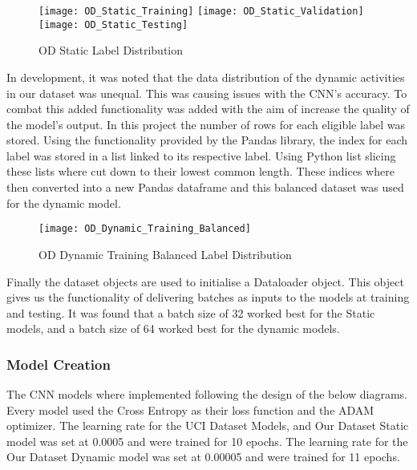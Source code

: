         \begin{figure}[htp]
        \centering
        \texttt{[image: OD\_Static\_Training]}\hfill
        \texttt{[image: OD\_Static\_Validation]}\hfill
        \texttt{[image: OD\_Static\_Testing]}
        \caption{OD Static Label Distribution}
        \label{fig:figureX}
        \end{figure}

        In development, it was noted that the data distribution of the dynamic activities in our dataset was unequal.
        This was causing issues with the CNN's accuracy.
        To combat this added functionality was added with the aim of increase the quality of the model's output.
        In this project the number of rows for each eligible label was stored.
        Using the functionality provided by the Pandas library, the index for each label was stored in a list linked to its respective label.
        Using Python list slicing these lists where cut down to their lowest common length.
        These indices where then converted into a new Pandas dataframe and this balanced dataset was used for the dynamic model.

        \begin{figure}[htp]
        \centering
        \texttt{[image: OD\_Dynamic\_Training\_Balanced]}
        \caption{OD Dynamic Training Balanced Label Distribution}
        \label{fig:figureX}
        \end{figure}

        Finally the dataset objects are used to initialise a Dataloader object.
        This object gives us the functionality of delivering batches as inputs to the models at training and testing.
        It was found that a batch size of 32 worked best for the Static models, and a batch size of 64 worked best for the dynamic models.

    \subsubsection{Model Creation}
        The CNN models where implemented following the design of the below diagrams.
        Every model used the Cross Entropy as their loss function and the ADAM optimizer.
        The learning rate for the UCI Dataset Models, and Our Dataset Static model was set at 0.0005 and were trained for 10 epochs.
        The learning rate for the Our Dataset Dynamic model was set at 0.00005 and were trained for 11 epochs.